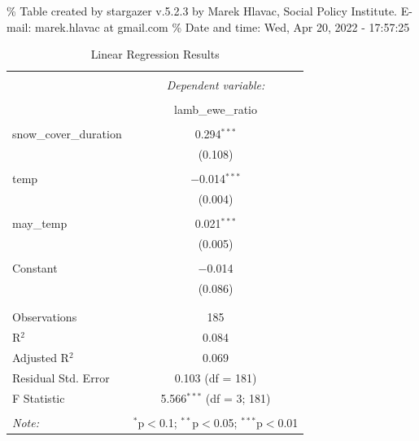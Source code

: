 \documentclass[
  12pt,
]{article}
\begin{document}
\% Table created by stargazer v.5.2.3 by Marek Hlavac, Social Policy
Institute. E-mail: marek.hlavac at gmail.com \% Date and time: Wed, Apr
20, 2022 - 17:57:25

\begin{table}[!htbp] \centering 
  \caption{Linear Regression Results} 
  \label{} 
\begin{tabular}{@{\extracolsep{5pt}}lc} 
\\[-1.8ex]\hline 
\hline \\[-1.8ex] 
 & \multicolumn{1}{c}{\textit{Dependent variable:}} \\ 
\cline{2-2} 
\\[-1.8ex] & lamb\_ewe\_ratio \\ 
\hline \\[-1.8ex] 
 snow\_cover\_duration & 0.294$^{***}$ \\ 
  & (0.108) \\ 
  & \\ 
 temp & $-$0.014$^{***}$ \\ 
  & (0.004) \\ 
  & \\ 
 may\_temp & 0.021$^{***}$ \\ 
  & (0.005) \\ 
  & \\ 
 Constant & $-$0.014 \\ 
  & (0.086) \\ 
  & \\ 
\hline \\[-1.8ex] 
Observations & 185 \\ 
R$^{2}$ & 0.084 \\ 
Adjusted R$^{2}$ & 0.069 \\ 
Residual Std. Error & 0.103 (df = 181) \\ 
F Statistic & 5.566$^{***}$ (df = 3; 181) \\ 
\hline 
\hline \\[-1.8ex] 
\textit{Note:}  & \multicolumn{1}{r}{$^{*}$p$<$0.1; $^{**}$p$<$0.05; $^{***}$p$<$0.01} \\ 
\end{tabular} 
\end{table}
\end{document}
